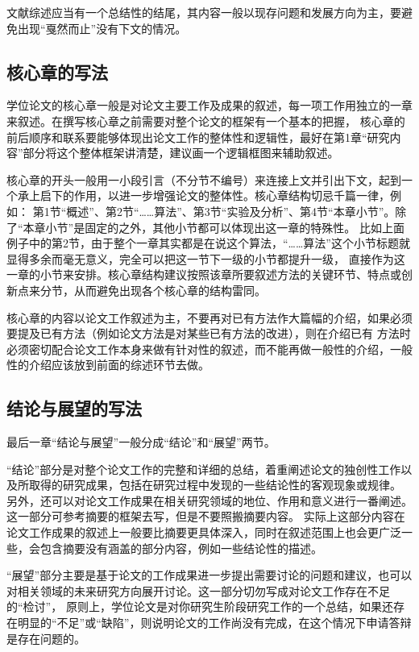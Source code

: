 文献综述应当有一个总结性的结尾，其内容一般以现存问题和发展方向为主，要避免出现“戛然而止”没有下文的情况。

\subsection{核心章的写法}

学位论文的核心章一般是对论文主要工作及成果的叙述，每一项工作用独立的一章来叙述。在撰写核心章之前需要对整个论文的框架有一个基本的把握，
核心章的前后顺序和联系要能够体现出论文工作的整体性和逻辑性，最好在第1章“研究内容”部分将这个整体框架讲清楚，建议画一个逻辑框图来辅助叙述。

核心章的开头一般用一小段引言（不分节不编号）来连接上文并引出下文，起到一个承上启下的作用，以进一步增强论文的整体性。核心章结构切忌千篇一律，例如：
第1节“概述”、第2节“……算法”、第3节“实验及分析”、第4节“本章小节”。除了“本章小节”是固定的之外，其他小节都可以体现出这一章的特殊性。
比如上面例子中的第2节，由于整个一章其实都是在说这个算法，“……算法”这个小节标题就显得多余而毫无意义，完全可以把这一节下一级的小节都提升一级，
直接作为这一章的小节来安排。核心章结构建议按照该章所要叙述方法的关键环节、特点或创新点来分节，从而避免出现各个核心章的结构雷同。

核心章的内容以论文工作叙述为主，不要再对已有方法作大篇幅的介绍，如果必须要提及已有方法（例如论文方法是对某些已有方法的改进），则在介绍已有
方法时必须密切配合论文工作本身来做有针对性的叙述，而不能再做一般性的介绍，一般性的介绍应该放到前面的综述环节去做。

\subsection{结论与展望的写法}

最后一章“结论与展望”一般分成“结论”和“展望”两节。

“结论”部分是对整个论文工作的完整和详细的总结，着重阐述论文的独创性工作以及所取得的研究成果，包括在研究过程中发现的一些结论性的客观现象或规律。
另外，还可以对论文工作成果在相关研究领域的地位、作用和意义进行一番阐述。这一部分可参考摘要的框架去写，但是不要照搬摘要内容。
实际上这部分内容在论文工作成果的叙述上一般要比摘要更具体深入，同时在叙述范围上也会更广泛一些，会包含摘要没有涵盖的部分内容，例如一些结论性的描述。

“展望”部分主要是基于论文的工作成果进一步提出需要讨论的问题和建议，也可以对相关领域的未来研究方向展开讨论。这一部分切勿写成对论文工作存在不足的“检讨”，
原则上，学位论文是对你研究生阶段研究工作的一个总结，如果还存在明显的“不足”或“缺陷”，则说明论文的工作尚没有完成，在这个情况下申请答辩是存在问题的。
